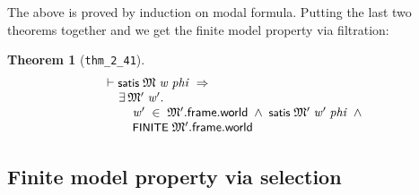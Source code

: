 \documentclass[letterpaper]{article}
\newtheorem{thm}{Theorem}
\renewcommand{\HOLConst}[1]{{\textsf{\upshape\small #1}}}
\newenvironment{holmath}{\begin{displaymath}\begin{array}{l}}{\end{array}\end{displaymath}\ignorespacesafterend}
\begin{document}
The above is proved by induction on modal formula. Putting the last two theorems together and we get the finite model property via filtration:
\begin{thm}[\texttt{thm_2_41}]
\begin{holmath}
  \ensuremath{\HOLTokenTurnstile}\HOLConst{satis}\;\HOLFreeVar{\ensuremath{\mathfrak{M}}}\;\HOLFreeVar{w}\;\HOLFreeVar{phi}\;\HOLSymConst{\HOLTokenImp{}}\\
\;\;\;\;\;\HOLSymConst{\HOLTokenExists{}}\HOLBoundVar{\ensuremath{\mathfrak{M}'}}\;\HOLBoundVar{w\sp{\prime}}.\\
\;\;\;\;\;\;\;\;\;\HOLBoundVar{w\sp{\prime}}\;\HOLSymConst{\HOLTokenIn{}}\;\HOLBoundVar{\ensuremath{\mathfrak{M}'}}.\HOLFieldName{frame}.\HOLFieldName{world}\;\HOLSymConst{\HOLTokenConj{}}\;\HOLConst{satis}\;\HOLBoundVar{\ensuremath{\mathfrak{M}'}}\;\HOLBoundVar{w\sp{\prime}}\;\HOLFreeVar{phi}\;\HOLSymConst{\HOLTokenConj{}}\\
\;\;\;\;\;\;\;\;\;\HOLConst{FINITE}\;\HOLBoundVar{\ensuremath{\mathfrak{M}'}}.\HOLFieldName{frame}.\HOLFieldName{world}
\end{holmath}
\end{thm}

\subsection{Finite model property via selection}
\end{document}
